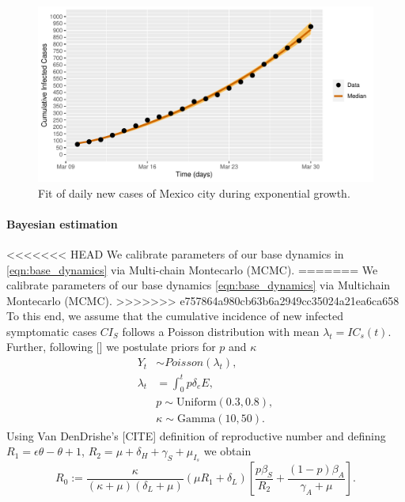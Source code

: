 \begin{figure}[htb]
    \centering
    \includegraphics[scale=0.7, keepaspectratio]{./cdmx_CIs_data_begining_fit}
    \caption{%
        Fit of daily new cases of Mexico city
        during exponential growth.
    }
    \label{fig:data_CDMX_fitting}
\end{figure}
%

\paragraph{Bayesian estimation}
<<<<<<< HEAD
We calibrate parameters of our base dynamics in
\eqref{eqn:base_dynamics} via Multi-chain Montecarlo (MCMC).
=======
We calibrate parameters of our base dynamics 
\eqref{eqn:base_dynamics} via Multichain Montecarlo (MCMC).
>>>>>>> e757864a980cb63b6a2949cc35024a21ea6ca658
To this end, we assume that the cumulative
incidence of new infected symptomatic cases $CI_S$
follows a Poisson distribution with mean $\lambda_t = IC_s(t)$. Further,
following [] we postulate priors for $p$ and $\kappa$
\begin{equation}
    \label{eqn:boservation_model}
    \begin{aligned}
        Y_t & \sim Poisson(\lambda_t),
        \\
        \lambda_t
        &=
        \int_{0}^t p \delta_e E ,
        \\
        & p \sim \text{Uniform} (0.3, 0.8),
        \\
        & \kappa \sim \text{Gamma}(10, 50).
    \end{aligned}
\end{equation}
%
\textbf{}
Using Van DenDrishe's [CITE] definition of reproductive number
and defining $R_1 = \epsilon\theta- \theta +1$,
$R_2 = \mu + \delta_H+\gamma_S+\mu_{I_{s}}$
we obtain
\begin{equation*}
    \label{eqn:reproductive_number}
    R_0 :=
  \frac{\kappa}{(\kappa+\mu)(\delta_L+\mu)}\left(\mu R_1+\delta_L\right)
  \left[\frac{p\beta_S}{R_2}
  +\frac{(1-p)\beta_A}{\gamma_A+\mu}\right].
\end{equation*}


